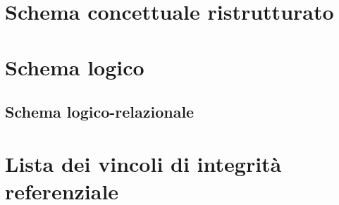\section{Schema concettuale ristrutturato}
\section{Schema logico}
\subsection{Schema logico-relazionale}
\section{Lista dei vincoli di integrità referenziale}

